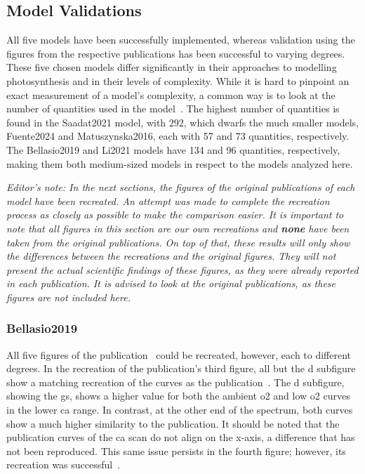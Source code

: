 \subsection{Model Validations}

All five models have been successfully implemented, whereas validation using the figures from the respective publications has been successful to varying degrees. These five chosen models differ significantly in their approaches to modelling photosynthesis and in their levels of complexity. While it is hard to pinpoint an exact measurement of a model's complexity, a common way is to look at the number of quantities used in the model~\cite{dattnerModelSelectionOrdinary2023}. The highest number of quantities is found in the Saadat2021 model, with 292, which dwarfs the much smaller models, Fuente2024 and Matuszynska2016, each with 57 and 73 quantities, respectively. The Bellasio2019 and Li2021 models have 134 and 96 quantities, respectively, making them both medium-sized models in respect to the models analyzed here.

\setlength{\LTleft}{-1.15cm}


\emph{Editor's note: In the next sections, the figures of the original publications of each model have been recreated. An attempt was made to complete the recreation process as closely as possible to make the comparison easier. It is important to note that all figures in this section are our own recreations and \textbf{none} have been taken from the original publications. On top of that, these results will only show the differences between the recreations and the original figures. They will not present the actual scientific findings of these figures, as they were already reported in each publication. It is advised to look at the original publications, as these figures are not included here.}

\subsubsection{Bellasio2019}

All five figures of the publication~\cite{bellasioGeneralisedDynamicModel2019} could be recreated, however, each to different degrees. In the recreation of the publication's third figure, all but the d subfigure show a matching recreation of the curves as the publication~. The d subfigure, showing the \gls{gs}, shows a higher value for both the ambient \gls{o2} and low \gls{o2} curves in the lower \gls{ca} range. In contrast, at the other end of the spectrum, both curves show a much higher similarity to the publication. It should be noted that the publication curves of the \gls{ca} scan do not align on the x-axis, a difference that has not been reproduced. This same issue persists in the fourth figure; however, its recreation was successful~.

